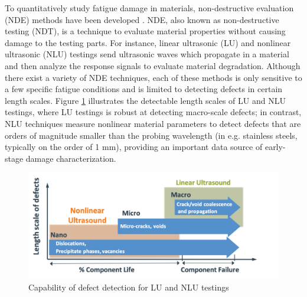 To quantitatively study fatigue damage in materials, non-destructive evaluation (NDE) methods have been developed \cite{nde-review-WISNER2020}. NDE, also known as non-destructive testing (NDT), is a technique to evaluate material properties without causing damage to the testing parts. For instance, linear ultrasonic (LU) and nonlinear ultrasonic (NLU) testings send ultrasonic waves which propagate in a material and then analyze the response signals to evaluate material degradation. Although there exist a variety of NDE techniques, each of these methods is only sensitive to a few specific fatigue conditions and is limited to detecting defects in certain length scales. Figure \ref{fig: lu nlu length scales} illustrates the detectable length scales of LU and NLU testings, where LU testings is robust at detecting macro-scale defects; in contrast, NLU techniques measure nonlinear material parameters to detect defects that are orders of magnitude smaller than the probing wavelength (in e.g. stainless steels, typically on the order of 1 mm), providing an important data source of early-stage damage characterization.

\begin{figure}[tb]
    \includegraphics[width=\linewidth]{fig/lu_nlu_length_scales.png}
    \caption{Capability of defect detection for LU and NLU testings}
    \label{fig: lu nlu length scales}
\end{figure}

